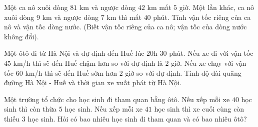 \begin{bt}%
	Một ca nô xuôi dòng $81$ km và ngược dòng $42$ km mất $5$ giờ. Một lần khác, ca nô xuôi dòng $9$ km và ngược dòng $7$ km thì mất $40$ phút. Tính vận tốc riêng của ca nô và vận tốc dòng nước. (Biết vận tốc riêng của ca nô; vận tốc của dòng nước không đổi).
\end{bt}
\begin{bt}%
	Một ôtô đi từ Hà Nội và dự định đến Huế lúc $20$h $30$ phút. Nếu xe đi với vận tốc $45$ km/h thì sẽ đến Huế chậm hơn so với dự định là $2$ giờ. Nếu xe chạy với vận tốc $60$ km/h thì sẽ đến Huế sớm hơn $2$ giờ so với dự định. Tính độ dài quãng đường Hà Nội - Huế và thời gian xe xuất phát từ Hà Nội.
\end{bt}
\begin{bt}%
	Một trường tổ chức cho học sinh đi tham quan bằng ôtô. Nếu xếp mỗi xe $40$ học sinh thì còn thừa $5$ học sinh. Nếu xếp mỗi xe $41$ học sinh thì xe cuối cùng còn thiếu $3$ học sinh. Hỏi có bao nhiêu học sinh đi tham quan và có bao nhiêu ôtô?
\end{bt}
